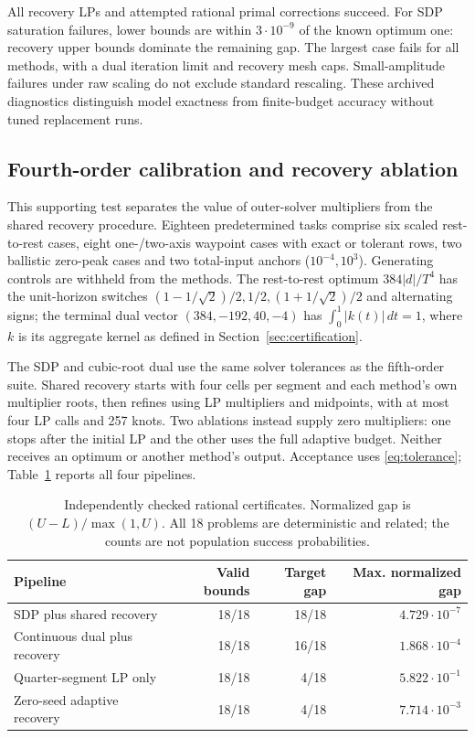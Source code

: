 \documentclass[pdflatex,sn-mathphys-num]{sn-jnl}
\theoremstyle{thmstyleone}
\theoremstyle{thmstyletwo}\newtheorem{remark}[theorem]{Remark}
\begin{document}
All recovery LPs and attempted rational primal corrections succeed.
For SDP saturation failures, lower bounds are within $3\cdot10^{-9}$ of
the known optimum one: recovery upper bounds dominate the remaining gap.
The largest case fails for all methods, with a dual iteration limit and
recovery mesh caps. Small-amplitude failures under raw scaling do not exclude
standard rescaling. These archived diagnostics distinguish model exactness
from finite-budget accuracy without tuned replacement runs.


\subsection{Fourth-order calibration and recovery ablation}\label{app:four-pilot}
This supporting test separates the value of outer-solver multipliers from
the shared recovery procedure. Eighteen predetermined tasks comprise six
scaled rest-to-rest cases, eight one-/two-axis waypoint cases with exact or
tolerant rows, two ballistic zero-peak cases and two total-input anchors
($10^{-4},10^3$). Generating controls are withheld from the methods.
The rest-to-rest optimum $384|d|/T^4$ has the unit-horizon switches
$(1-1/\sqrt2)/2,1/2,(1+1/\sqrt2)/2$ and alternating signs; the terminal
dual vector $(384,-192,40,-4)$ has $\int_0^1|k(t)|\,dt=1$, where $k$
is its aggregate kernel as defined in Section~\ref{sec:certification}.

The SDP and cubic-root dual use the same solver tolerances as the fifth-order
suite. Shared recovery starts with four cells per segment and each method's
own multiplier roots, then refines using LP multipliers and midpoints, with
at most four LP calls and 257 knots. Two ablations instead supply zero
multipliers: one stops after the initial LP and the other uses the full
adaptive budget. Neither receives an optimum or another method's output.
Acceptance uses \eqref{eq:tolerance}; Table~\ref{tab:pilot} reports all four
pipelines.
\begin{table}[ht]
\centering\small
\caption{Independently checked rational certificates. Normalized gap is
$(U-L)/\max(1,U)$. All 18 problems are deterministic and related; the
counts are not population success probabilities.}\label{tab:pilot}
\begin{tabular}{@{}p{50mm}rrr@{}}
\toprule
Pipeline & Valid bounds & Target gap & Max. normalized gap\\
\midrule
SDP plus shared recovery &18/18&18/18&$4.729\cdot10^{-7}$\\
Continuous dual plus recovery &18/18&16/18&$1.868\cdot10^{-4}$\\
Quarter-segment LP only &18/18&4/18&$5.822\cdot10^{-1}$\\
Zero-seed adaptive recovery &18/18&4/18&$7.714\cdot10^{-3}$\\
\bottomrule
\end{tabular}
\end{table}
\end{document}
